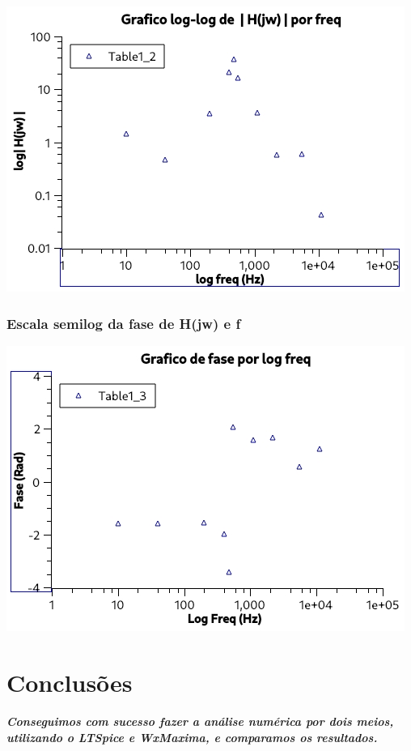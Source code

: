\documentclass[12pt,twoside, a4paper, twocolumn]{article}
\begin{document}
\begin{adjustbox}{scale=0.70}
    \includegraphics{Graph1.jpeg}
\end{adjustbox}


\subsubsection{Escala semilog da fase de H(jw) e f}
\begin{adjustbox}{scale=0.70}
    \includegraphics{Graph2.jpeg}
\end{adjustbox}


\section{Conclusões}


\subparagraph*{Conseguimos com sucesso fazer a análise numérica por dois meios, utilizando o LTSpice e WxMaxima, e comparamos os resultados.}
\end{document}
